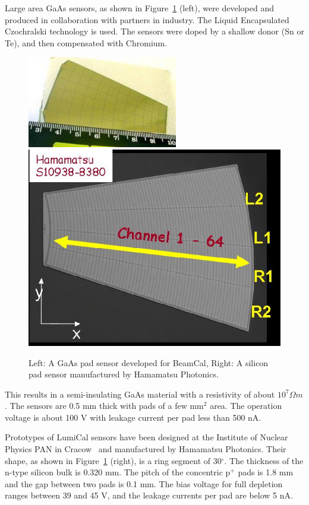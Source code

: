 Large area GaAs sensors, as shown in Figure~\ref{fig:GaAs} (left), were developed
and produced in collaboration with partners in industry. The Liquid Encapsulated
Czochralski technology is used. The sensors were
doped by a shallow donor (Sn or Te),
and then compensated  with Chromium.
\begin{figure}[hbp]
\centering
    \includegraphics[width=0.4\columnwidth, height=4cm]{Calorimeter/FCAL/figs/GaAs_sensor_new.jpg}
    \hspace{1cm}
     \includegraphics[width=0.4\columnwidth]{Calorimeter/FCAL/figs/si_proto.jpg}
          \caption{Left: A GaAs pad sensor developed for BeamCal, Right: A silicon pad sensor 
                         manufactured by Hamamatsu Photonics.}
    \label{fig:GaAs}
\end{figure}
This results in a semi-insulating GaAs material with a resistivity of about $10^7{\Omega m}$.
The sensors are 0.5 {mm} thick with pads of a few mm$^2$ area. The operation voltage is about 100 {V} with
leakage current per pad less than 500 {nA}.

Prototypes of LumiCal sensors have been designed
at the Institute of Nuclear Physics PAN
in Cracow~\cite{EUDETMEMO-2009-07} 
and manufactured by Hamamatsu
Photonics.
Their shape, as shown in Figure~\ref{fig:GaAs} (right), is a ring segment of 30$^\circ$.
The thickness of the n-type silicon bulk is 0.320 {mm}.
The pitch of the concentric p$^+$ pads is 1.8 {mm} and
the gap between two pads is 0.1 {mm}.
The bias voltage for full depletion ranges between 39 and 45 {V},
and the leakage currents per pad are below 5 {nA}.

